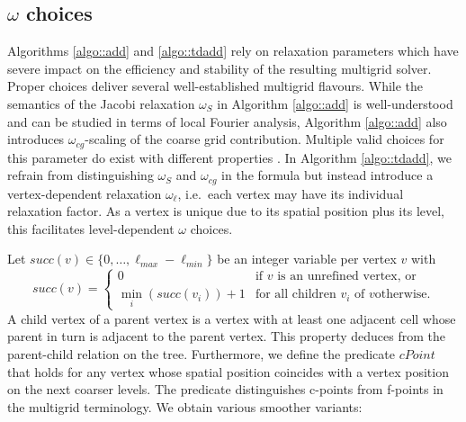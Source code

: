 \subsection{$\omega$ choices}


Algorithms \ref{algo::add} and \ref{algo::tdadd} rely on relaxation
parameters which have severe impact on the efficiency and stability of the
resulting multigrid solver.
Proper choices deliver several well-established multigrid flavours. 
While the semantics of the Jacobi relaxation $\omega_S$ in Algorithm 
\ref{algo::add} is well-understood and can be studied in terms of local Fourier
analysis, Algorithm \ref{algo::add} also introduces $\omega_{cg}$-scaling of the
coarse grid contribution.
Multiple valid choices for this parameter do exist with
different properties \cite{Bastian:98:AdditiveVsMultiplicativeMG}.
In Algorithm \ref{algo::tdadd}, we refrain from distinguishing $\omega_{S}$ and
$\omega_{cg}$ in the formula but instead introduce a vertex-dependent
relaxation $\omega_\ell$, i.e.~each vertex may have its individual relaxation
factor.
As a vertex is unique due to its spatial position plus its level, this 
facilitates level-dependent $\omega$ choices.


Let $succ(v) \in \{0,\ldots,\ell _{max}-\ell _{min}\}$ be an integer
variable per vertex $v$ with
\[
  succ(v) = \left\{ 
    \begin{array}{ll}
      0 & \mbox{if $v$ is an unrefined vertex, or} \\
      \min _{i} (succ(v_i))+1 & \mbox{for all children $v_i$ of $v$
      otherwise.}
    \end{array}
  \right.
\]
A child vertex of a parent vertex is a vertex with at least one adjacent cell
whose parent in turn is adjacent to the parent vertex.
This property deduces from the parent-child relation on the tree.
Furthermore, we define the predicate $cPoint$ that holds for any
vertex whose spatial position coincides with a vertex position on the next coarser levels.
The predicate distinguishes c-points from f-points in the multigrid terminology.
We obtain various smoother variants:

